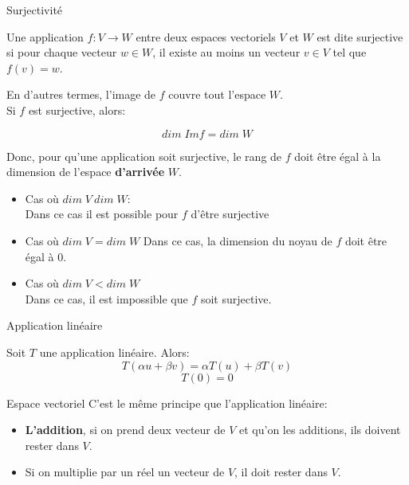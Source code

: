 \begin{parag}{Surjectivité}
    \begin{truc}
        Une application $f : V \to W$ entre deux espaces vectoriels $V$ et $W$ est dite surjective si pour chaque vecteur $w \in W$, il existe au moins un vecteur $v \in V$ tel que $f(v) = w$.
    \end{truc}
     En d'autres termes, l'image de $f$ couvre tout l'espace $W$.
    \\
    Si $f$  est surjective, alors:
    \begin{truc}
        \[dim\; Imf = dim\; W\]
    \end{truc}  
    Donc, pour qu'une application soit surjective, le rang de $f$ doit être égal à la dimension de l'espace \textbf{d'arrivée} $W$.
    \begin{itemize}
        \item Cas où $dim\;V \> dim\;W$:
        \\
        Dans ce cas il est possible pour $f$ d'être surjective
        \item Cas où $dim\;V = dim\;W$
        Dans ce cas, la dimension du noyau de $f$ doit être égal à $0$. 
        \item Cas où $dim \; V < dim\; W$
        \\
        Dans ce cas, il est impossible que $f$ soit surjective.
    \end{itemize}
\end{parag}

\begin{parag}{Application linéaire}
    \begin{truc}
        Soit $T$ une application linéaire. Alors:
        \[T(\alpha u + \beta v) = \alpha T(u) + \beta T(v)\]
        \[T(0) = 0\]
    \end{truc}
\end{parag}

\begin{parag}{Espace vectoriel}
    C'est le même principe que l'application linéaire:
    \begin{itemize}
        \item \textbf{L'addition}, si on prend deux vecteur de $V$ et qu'on les additions, ils doivent rester dans $V$.
        \item Si on multiplie par un réel un vecteur de $V$, il doit rester dans $V$.
    \end{itemize}
    
\end{parag}


